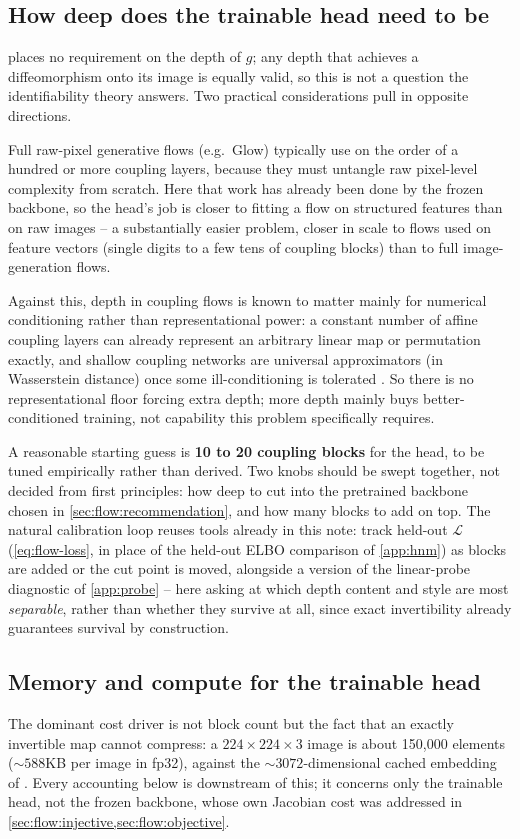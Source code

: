 \subsection{How deep does the trainable head need to be}
\label{sec:flow:depth}
 places no requirement on the depth of $g$; any depth that achieves a diffeomorphism onto
its image is equally valid, so this is not a question the identifiability theory answers. Two practical
considerations pull in opposite directions.

Full raw-pixel generative flows (e.g.\ Glow) typically use on the order of a hundred or more coupling
layers, because they must untangle raw pixel-level complexity from scratch. Here that work has already
been done by the frozen backbone, so the head's job is closer to fitting a flow on structured features
than on raw images -- a substantially easier problem, closer in scale to flows used on feature vectors
(single digits to a few tens of coupling blocks) than to full image-generation flows.

Against this, depth in coupling flows is known to matter mainly for numerical conditioning rather than
representational power: a constant number of affine coupling layers can already represent an arbitrary
linear map or permutation exactly, and shallow coupling networks are universal approximators (in
Wasserstein distance) once some ill-conditioning is tolerated \cite{koehler2021}. So there is no
representational floor forcing extra depth; more depth mainly buys better-conditioned training, not
capability this problem specifically requires.

A reasonable starting guess is \textbf{10 to 20 coupling blocks} for the head, to be tuned empirically
rather than derived. Two knobs should be swept together, not decided from first principles: how deep to
cut into the pretrained backbone chosen in \cref{sec:flow:recommendation}, and how many blocks to add on
top. The natural calibration loop reuses tools already in this note: track held-out $\mathcal L$
(\cref{eq:flow-loss}, in place of the held-out ELBO comparison of \cref{app:hnm}) as blocks are added or
the cut point is moved, alongside a version of the linear-probe diagnostic of \cref{app:probe} -- here
asking at which depth content and style are most \emph{separable}, rather than whether they survive at
all, since exact invertibility already guarantees survival by construction.

\subsection{Memory and compute for the trainable head}
\label{sec:flow:memory}
The dominant cost driver is not block count but the fact that an exactly invertible map cannot compress:
a $224\times224\times3$ image is about 150{,}000 elements ($\sim\!588$KB per image in fp32), against the
$\sim\!3072$-dimensional cached embedding of . Every accounting below is downstream of
this; it concerns only the trainable head, not the frozen backbone, whose own Jacobian cost was addressed
in \cref{sec:flow:injective,sec:flow:objective}.

